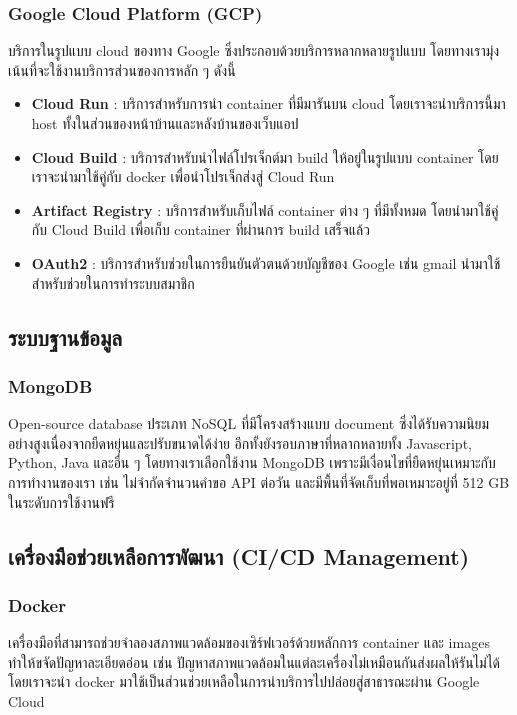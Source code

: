 \subsubsection{Google Cloud Platform (GCP)}
บริการในรูปแบบ cloud ของทาง Google ซึ่งประกอบด้วยบริการหลากหลายรูปแบบ
โดยทางเรามุ่งเน้นที่จะใช้งานบริการส่วนของการหลัก ๆ ดังนี้
\begin{itemize}
      \item \textbf{Cloud Run} : บริการสำหรับการนำ container ที่มีมารันบน cloud โดยเราจะนำบริการนี้มา host ทั้งในส่วนของหน้าบ้านและหลังบ้านของเว็บแอป
      \item \textbf{Cloud Build} : บริการสำหรับนำไฟล์โปรเจ็กต์มา build ให้อยู่ในรูปแบบ container โดยเราจะนำมาใช้คู่กับ docker เพื่อนำโปรเจ็กส่งสู่ Cloud Run
      \item \textbf{Artifact Registry} : บริการสำหรับเก็บไฟล์ container ต่าง ๆ ที่มีทั้งหมด โดยนำมาใช้คู่กับ Cloud Build เพื่อเก็บ container ที่ผ่านการ build เสร็จแล้ว
      \item \textbf{OAuth2} : บริการสำหรับช่วยในการยืนยันตัวตนด้วยบัญชีของ Google เช่น gmail นำมาใช้สำหรับช่วยในการทำระบบสมาชิก
\end{itemize}

\subsection{ระบบฐานข้อมูล}
\subsubsection{MongoDB}
Open-source database ประเภท NoSQL ที่มีโครงสร้างแบบ document
ซึ่งได้รับความนิยมอย่างสูงเนื่องจากยืดหยุ่นและปรับขนาดได้ง่าย
อีกทั้งยังรอบภาษาที่หลากหลายทั้ง Javascript, Python, Java และอื่น ๆ
โดยทางเราเลือกใช้งาน MongoDB เพราะมีเงื่อนไขที่ยืดหยุ่นเหมาะกับการทำงานของเรา
เช่น ไม่จำกัดจำนวนคำขอ API ต่อวัน และมีพื้นที่จัดเก็บที่พอเหมาะอยู่ที่ 512 GB
ในระดับการใช้งานฟรี
\subsection{เครื่องมือช่วยเหลือการพัฒนา (CI/CD Management)}
\subsubsection{Docker}
เครื่องมือที่สามารถช่วยจำลองสภาพแวดล้อมของเซิร์ฟเวอร์ด้วยหลักการ container
และ images ทำให้ขจัดปัญหาละเอียดอ่อน เช่น ปัญหาสภาพแวดล้อมในแต่ละเครื่องไม่เหมือนกันส่งผลให้รันไม่ได้ โดยเราจะนำ docker มาใช้เป็นส่วนช่วยเหลือในการนำบริการไปปล่อยสู่สาธารณะผ่าน Google Cloud
